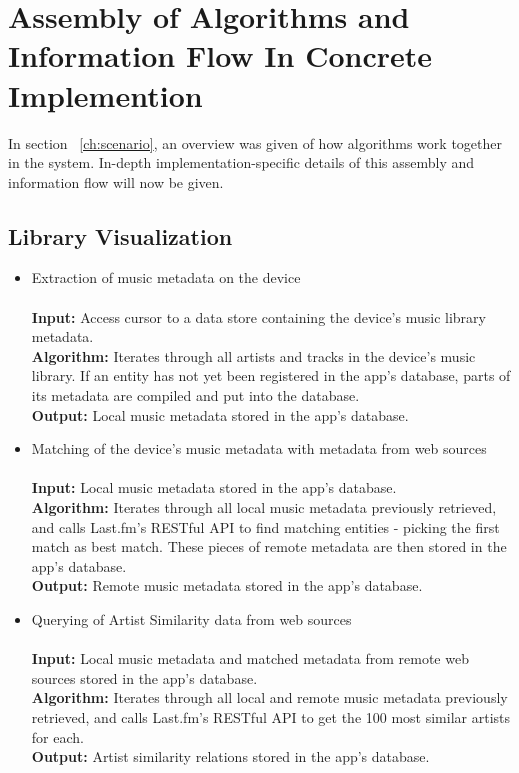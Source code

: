 \section{Assembly of Algorithms and Information Flow In Concrete Implemention}
\label{sec:algorithm-assembly}

In section ~\ref{ch:scenario}, an overview was given of how algorithms work together in the system. In-depth implementation-specific details of this assembly and information flow will now be given.

\subsection{Library Visualization}

\begin{itemize}
	\item Extraction of music metadata on the device \\\\
			\textbf{Input:} Access cursor to a data store containing the device's music library metadata.  \\
			\textbf{Algorithm:} Iterates through all artists and tracks in the device's music library.
			If an entity has not yet been registered in the app's database, parts of its metadata are 
			compiled and put into the database. \\
			\textbf{Output:} Local music metadata stored in the app's database.\\
			
	\item Matching of the device's music metadata with metadata from web sources \\\\
			\textbf{Input:} Local music metadata stored in the app's database.  \\
			\textbf{Algorithm:} Iterates through all local music metadata previously retrieved, and calls
			Last.fm's RESTful API to find matching entities - picking the first match as best match. These pieces
			of remote metadata are then stored in the app's database. \\
			\textbf{Output:} Remote music metadata stored in the app's database. \\
			
	\item Querying of Artist Similarity data from web sources \\\\
			\textbf{Input:} Local music metadata and matched metadata from remote web sources stored in the app's database. \\
			\textbf{Algorithm:} Iterates through all local and remote music metadata previously retrieved, and calls
			Last.fm's RESTful API to get the 100 most similar artists for each. \\
			\textbf{Output:} Artist similarity relations stored in the app's database. \\
			

\end{itemize}
